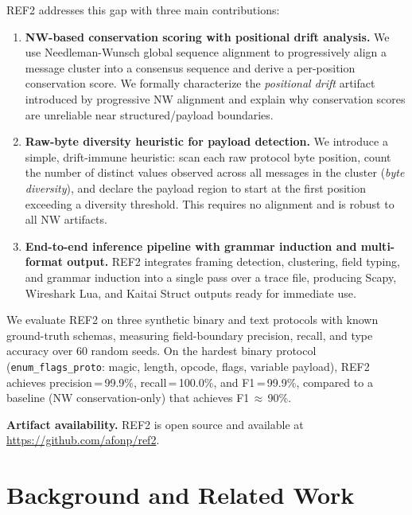 \documentclass[letterpaper,twocolumn,10pt]{article}
\begin{document}
\textsc{REF2} addresses this gap with three main contributions:

\begin{enumerate}
  \item \textbf{NW-based conservation scoring with positional drift analysis.}
    We use Needleman-Wunsch global sequence alignment to progressively align a
    message cluster into a consensus sequence and derive a per-position
    conservation score.  We formally characterize the \emph{positional drift}
    artifact introduced by progressive NW alignment and explain why conservation
    scores are unreliable near structured/payload boundaries.

  \item \textbf{Raw-byte diversity heuristic for payload detection.}
    We introduce a simple, drift-immune heuristic: scan each raw protocol byte
    position, count the number of distinct values observed across all messages
    in the cluster (\emph{byte diversity}), and declare the payload region to
    start at the first position exceeding a diversity threshold.  This requires
    no alignment and is robust to all NW artifacts.

  \item \textbf{End-to-end inference pipeline with grammar induction and
    multi-format output.}  \textsc{REF2} integrates framing detection,
    clustering, field typing, and grammar induction into a single pass over a
    trace file, producing Scapy, Wireshark Lua, and Kaitai Struct outputs ready
    for immediate use.
\end{enumerate}

We evaluate \textsc{REF2} on three synthetic binary and text protocols with
known ground-truth schemas, measuring field-boundary precision, recall, and
type accuracy over 60 random seeds.  On the hardest binary protocol
(\texttt{enum\_flags\_proto}: magic, length, opcode, flags, variable payload),
\textsc{REF2} achieves precision\,=\,99.9\%, recall\,=\,100.0\%, and
F1\,=\,99.9\%, compared to a baseline (NW conservation-only) that achieves
F1\,$\approx$\,90\%.

\medskip
\noindent\textbf{Artifact availability.}  \textsc{REF2} is open source and
available at \url{https://github.com/afonp/ref2}.

\section{Background and Related Work}
\label{sec:background}
\end{document}
